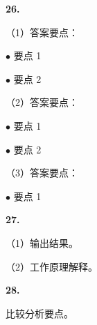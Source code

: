 \documentclass[11pt,a4paper]{article}
\begin{document}
\textbf{26.}

（1）答案要点：
\par\noindent\hspace{1em}$\bullet$ 要点 1
\par\noindent\hspace{1em}$\bullet$ 要点 2

（2）答案要点：
\par\noindent\hspace{1em}$\bullet$ 要点 1
\par\noindent\hspace{1em}$\bullet$ 要点 2

（3）答案要点：
\par\noindent\hspace{1em}$\bullet$ 要点 1

\textbf{27.}

（1）输出结果。

（2）工作原理解释。

\textbf{28.}

比较分析要点。

\label{ans:last}
\end{document}
